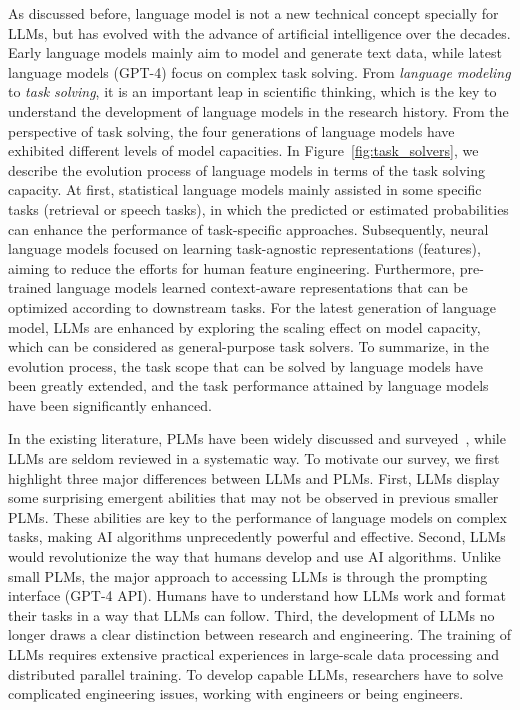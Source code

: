 {
As discussed before, language model is not a new technical concept specially for LLMs, but has evolved with the advance of artificial intelligence over the decades. Early language models mainly aim to model and generate text data, while latest language models (\eg GPT-4) focus on  {complex task solving}. From \emph{language modeling} to \emph{task solving}, it is an important leap in scientific thinking, which is the key to understand the development of   language models in the research history. 
From the perspective of task solving, the four generations of language models have exhibited different levels of model capacities.  
  In Figure~\ref{fig:task_solvers}, we describe the  evolution  process  of language models in terms of the task solving capacity.
At first, statistical language models mainly assisted in some specific tasks (\eg retrieval or speech tasks), in which the predicted or estimated probabilities can enhance the performance of task-specific approaches.
Subsequently, neural language models focused on learning task-agnostic representations (\eg features), aiming  to reduce the efforts for human feature engineering. Furthermore, pre-trained language models  learned context-aware representations that can be optimized according to downstream  tasks. For the latest generation of language model, LLMs are enhanced by exploring the scaling effect on model capacity, which can be considered as   general-purpose task solvers. To summarize, in the evolution process, the task scope that can be solved by language models have been greatly extended, and the task performance attained by language models have been significantly enhanced. 
}

In the existing literature, PLMs have been widely discussed and surveyed~\cite{Liu-survey-2023-Pre-train,Zhou-arxiv-2023-A,Han-AIopen-2021-PTM,qiu-CoRR-2020-PTM}, while LLMs are seldom reviewed in a systematic way. To  motivate our survey, we first highlight three major differences between LLMs and PLMs. 
First, LLMs display some surprising emergent abilities that may not be observed in previous smaller  PLMs. These abilities are key to the performance of language models on complex tasks, making AI algorithms unprecedently powerful and effective.   
Second, LLMs would  revolutionize  the way that humans  develop and use AI algorithms.    
Unlike small PLMs, the major approach to accessing LLMs is  through the prompting interface (\eg GPT-4 API). Humans have to understand how LLMs work and format their tasks in a way that LLMs can follow.   
Third, the development of LLMs no longer draws a clear distinction between research and engineering. The training of LLMs requires extensive  practical experiences in large-scale data processing and distributed parallel training.  
To develop capable LLMs, researchers have to solve complicated engineering issues, working with engineers or being engineers. 

